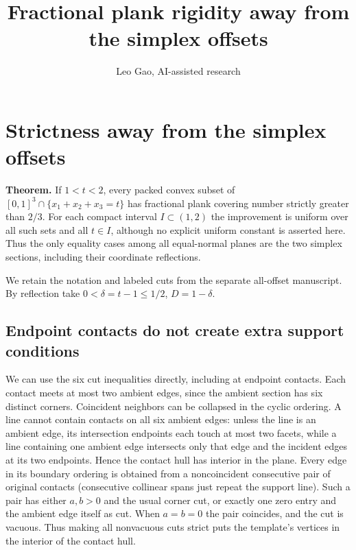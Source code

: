 \documentclass[
  10pt,
]{article}
\title{Fractional plank rigidity away from the simplex offsets}
\author{Leo Gao, AI-assisted research}
\date{}
\begin{document}
\maketitle

\section{Strictness away from the simplex
offsets}\label{strictness-away-from-the-simplex-offsets}


\textbf{Theorem.} If \(1<t<2\), every packed convex subset of
\([0,1]^3\cap\{x_1+x_2+x_3=t\}\) has fractional plank covering number
strictly greater than \(2/3\). For each compact interval
\(I\subset(1,2)\) the improvement is uniform over all such sets and all
\(t\in I\), although no explicit uniform constant is asserted here. Thus
the only equality cases among all equal-normal planes are the two
simplex sections, including their coordinate reflections.

We retain the notation and labeled cuts from
the separate all-offset manuscript. By reflection
take \(0<\delta=t-1\le1/2\), \(D=1-\delta\).

\subsection{Endpoint contacts do not create extra support
conditions}\label{endpoint-contacts-do-not-create-extra-support-conditions}

We can use the six cut inequalities directly, including at endpoint
contacts. Each contact meets at most two ambient edges, since the
ambient section has six distinct corners. Coincident neighbors can be
collapsed in the cyclic ordering. A line cannot contain contacts on all
six ambient edges: unless the line is an ambient edge, its intersection
endpoints each touch at most two facets, while a line containing one
ambient edge intersects only that edge and the incident edges at its two
endpoints. Hence the contact hull has interior in the plane. Every edge
in its boundary ordering is obtained from a noncoincident consecutive
pair of original contacts (consecutive collinear spans just repeat the
support line). Such a pair has either \(a,b>0\) and the usual corner
cut, or exactly one zero entry and the ambient edge itself as cut. When
\(a=b=0\) the pair coincides, and the cut is vacuous. Thus making all
nonvacuous cuts strict puts the template's vertices in the interior of
the contact hull.
\end{document}
